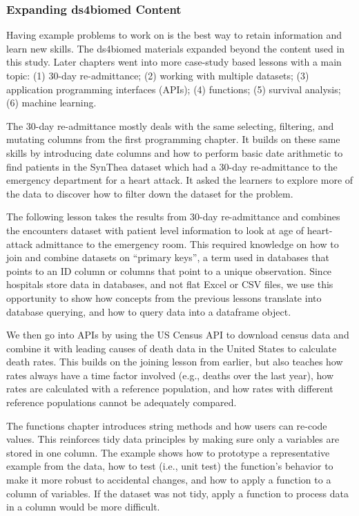 \documentclass[030-workshop.tex]{subfiles}
\begin{document}
    \subsubsection{Expanding ds4biomed Content}

        Having example problems to work on is the best way to retain information and learn new skills.
        The ds4biomed materials expanded beyond the content used in this study.
        Later chapters went into more case-study based lessons with a main topic:
        (1) 30-day re-admittance;
        (2) working with multiple datasets;
        (3) application programming interfaces (APIs);
        (4) functions;
        (5) survival analysis;
        (6) machine learning.

        The 30-day re-admittance mostly deals with the same selecting, filtering, and mutating columns
        from the first programming chapter.
        It builds on these same skills by introducing date columns and how to perform basic date arithmetic
        to find patients in the SynThea dataset which had a 30-day re-admittance to the emergency department for a heart attack.
        It asked the learners to explore more of the data to discover how to filter down the dataset for the problem.

        The following lesson takes the results from 30-day re-admittance and combines the encounters dataset with
        patient level information to look at age of heart-attack admittance to the emergency room.
        This required knowledge on how to join and combine datasets on ``primary keys'',
        a term used in databases that points to an ID column or columns that point to a unique observation.
        Since hospitals store data in databases, and not flat Excel or CSV files,
        we use this opportunity to show how concepts from the previous lessons translate into database querying,
        and how to query data into a dataframe object.

        We then go into APIs by using the US Census API to download census data and combine it with
        leading causes of death data in the United States to calculate death rates.
        This builds on the joining lesson from earlier,
        but also teaches how rates always have a time factor involved (e.g., deaths over the last year),
        how rates are calculated with a reference population,
        and how rates with different reference populations cannot be adequately compared.

        The functions chapter introduces string methods and how users can re-code values.
        This reinforces tidy data principles by making sure only a variables are stored in one column.
        The example shows how to prototype a representative example from the data,
        how to test (i.e., unit test) the function's behavior to make it more robust to accidental changes,
        and how to apply a function to a column of variables.
        If the dataset was not tidy,
        apply a function to process data in a column would be more difficult.
\end{document}

